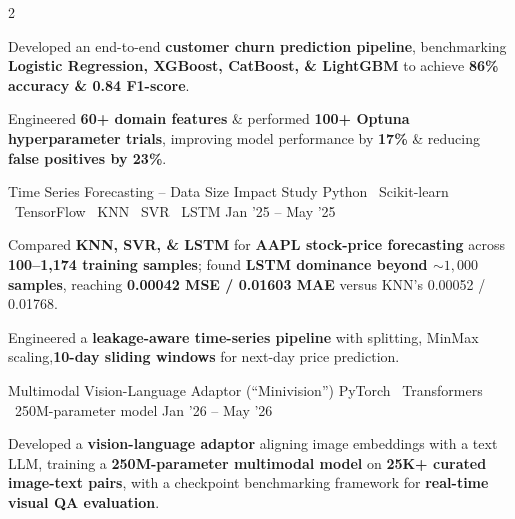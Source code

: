\documentclass{resume}
\begin{document}
\begin{paracol}{2}
{\begin{resumeItemize}
\item Developed an end-to-end
\textbf{customer churn prediction pipeline},
benchmarking \textbf{Logistic Regression, XGBoost, CatBoost,
\& LightGBM} to achieve \textbf{86\% accuracy \& 0.84 F1-score}.

\item Engineered
\textbf{60+ domain features}
\& performed \textbf{100+ Optuna hyperparameter trials},
improving model performance by \textbf{17\%}
\& reducing \textbf{false positives by 23\%}.

\end{resumeItemize}
}
{\href{https://github.com/NikhilSwaroop-P/ByteStorm-Appian/tree/hemanth}{\faGithub}}

\resumeDivider


\resumeProject
{Time Series Forecasting -- Data Size Impact Study}
{Python \textbar\ Scikit-learn \textbar\ TensorFlow \textbar\ KNN \textbar\ SVR \textbar\ LSTM}
{Jan '25 -- May '25}
{
\begin{resumeItemize}

\item Compared
\textbf{KNN, SVR, \& LSTM}
for \textbf{AAPL stock-price forecasting} across
\textbf{100--1,174 training samples};
found \textbf{LSTM dominance beyond ${\sim}1{,}000$ samples},
reaching \textbf{0.00042 MSE / 0.01603 MAE}
versus KNN's 0.00052 / 0.01768.

\item Engineered a
\textbf{leakage-aware time-series pipeline}
with splitting, MinMax scaling,\textbf{10-day sliding windows}
for next-day price prediction.

\end{resumeItemize}
}
{\href{https://github.com/hemanthdatta/ml-project}{\faGithub}}

\resumeDivider


\resumeProject
{Multimodal Vision-Language Adaptor (``Minivision'')}
{PyTorch \textbar\ Transformers \textbar\ 250M-parameter model}
{Jan '26 -- May '26}
{
\begin{resumeItemize}

\item Developed a
\textbf{vision-language adaptor}
aligning image embeddings with a text LLM, training a
\textbf{250M-parameter multimodal model}
on \textbf{25K+ curated image-text pairs},
with a checkpoint benchmarking framework for
\textbf{real-time visual QA evaluation}.


\end{resumeItemize}}
\end{paracol}
\end{document}
